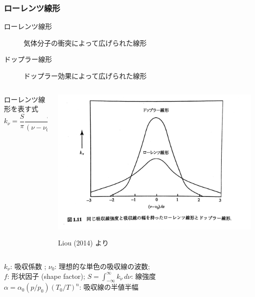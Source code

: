 \documentclass[unicode,colorlinks]{beamer}
\newcommand{\centeralign}[1]{\rule{0pt}{0pt}\hfill#1\hfill\rule{0pt}{0pt}}
\newcommand{\Unit}[1]{\,\mathrm{#1}}
\begin{document}
\begin{frame}
	\frametitle{ローレンツ線形}
	\begin{description}
		\item[ローレンツ線形] 気体分子の衝突によって広げられた線形
		\item[ドップラー線形] ドップラー効果によって広げられた線形
	\end{description}

	\hfill

	\begin{columns}
		\begin{column}{0.5\textwidth}
			ローレンツ線形を表す式
			\[k_\nu=\frac{S}{\pi}\frac{\alpha}{(\nu-\nu_0)^2+\alpha^2}=Sf[\nu-\nu_0]\]
		\end{column}
		\begin{column}{0.5\textwidth}
			\centeralign{\includegraphics[width=\textwidth]{lorentz.jpg}}
			\centeralign{\tiny Liou (2014) より}
		\end{column}
	\end{columns}

	{\small
		$k_\nu$: 吸収係数 ;\quad
		$\nu_0$: 理想的な単色の吸収線の波数;\\
		$f$: 形状因子 (shape factor);\quad
		$\displaystyle S=\int^\infty_{-\infty}k_\nu\,d\nu$: 線強度\\
		$\alpha=\alpha_0(p/p_0)(T_0/T)^n$: 吸収線の半値半幅
	}

\end{frame}

% 
% 
\end{document}
